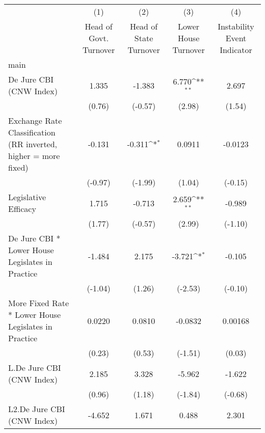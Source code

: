 {
\def\sym#1{\ifmmode^{#1}\else\(^{#1}\)\fi}
\begin{longtable}{l*{4}{c}}
\hline\hline\endfirsthead\hline\endhead\hline\endfoot\endlastfoot
                &\multicolumn{1}{c}{(1)}&\multicolumn{1}{c}{(2)}&\multicolumn{1}{c}{(3)}&\multicolumn{1}{c}{(4)}\\
                &\multicolumn{1}{c}{Head of Govt. Turnover}&\multicolumn{1}{c}{Head of State Turnover}&\multicolumn{1}{c}{Lower House Turnover}&\multicolumn{1}{c}{Instability Event Indicator}\\
\hline
main            &                  &                  &                  &                  \\
De Jure CBI (CNW Index)&    1.335         &   -1.383         &    6.770\sym{**} &    2.697         \\
                &   (0.76)         &  (-0.57)         &   (2.98)         &   (1.54)         \\
[1em]
Exchange Rate Classification (RR inverted, higher = more fixed)&   -0.131         &   -0.311\sym{*}  &   0.0911         &  -0.0123         \\
                &  (-0.97)         &  (-1.99)         &   (1.04)         &  (-0.15)         \\
[1em]
Legislative Efficacy&    1.715         &   -0.713         &    2.659\sym{**} &   -0.989         \\
                &   (1.77)         &  (-0.57)         &   (2.99)         &  (-1.10)         \\
[1em]
De Jure CBI * Lower House Legislates in Practice&   -1.484         &    2.175         &   -3.721\sym{*}  &   -0.105         \\
                &  (-1.04)         &   (1.26)         &  (-2.53)         &  (-0.10)         \\
[1em]
More Fixed Rate * Lower House Legislates in Practice&   0.0220         &   0.0810         &  -0.0832         &  0.00168         \\
                &   (0.23)         &   (0.53)         &  (-1.51)         &   (0.03)         \\
[1em]
L.De Jure CBI (CNW Index)&    2.185         &    3.328         &   -5.962         &   -1.622         \\
                &   (0.96)         &   (1.18)         &  (-1.84)         &  (-0.68)         \\
[1em]
L2.De Jure CBI (CNW Index)&   -4.652         &    1.671         &    0.488         &    2.301         \\

\end{longtable}}
